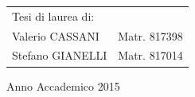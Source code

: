 \begin{titlepage}
\begin{flushright}
\begin{tabular}{ll}
Tesi di laurea di: & \tabularnewline
Valerio CASSANI & Matr. 817398\tabularnewline
Stefano GIANELLI & Matr. 817014\tabularnewline
\end{tabular}\vspace{2.2cm}

\par\end{flushright}

\begin{center}
{\large{}Anno Accademico 2015}
\par\end{center}{\large \par}

\end{titlepage}
